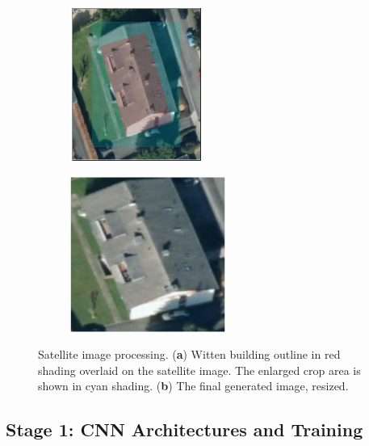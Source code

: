 \unskip
\begin{figure}[ht]
    \centering
    \begin{subfigure}[t]{0.5\columnwidth}
        \centering
        \includegraphics[height=2.0in]{chapter_4_roofshape/imgs/rgb_building_overlay.png}
        \caption{}
        \label{fig:rgb_overlay}
    \end{subfigure}%
    \hfill
    \begin{subfigure}[t]{0.5\columnwidth}
        \centering
        \includegraphics[height=2.0in]{chapter_4_roofshape/imgs/rgb_building.png}
        \caption{}
        \label{fig:rgb_building}
    \end{subfigure}
    \vspace{-12pt}

    \caption[Satellite image processing]{Satellite image processing. (\textbf{a}) Witten building outline in red shading overlaid on the satellite image. The enlarged crop area is shown in cyan shading. (\textbf{b}) The final generated image, resized.}
      \label{fig:rgb_building1}
\end{figure}


\subsection{Stage 1: CNN Architectures and Training} \label{sections:cnn_training_stage_one}

